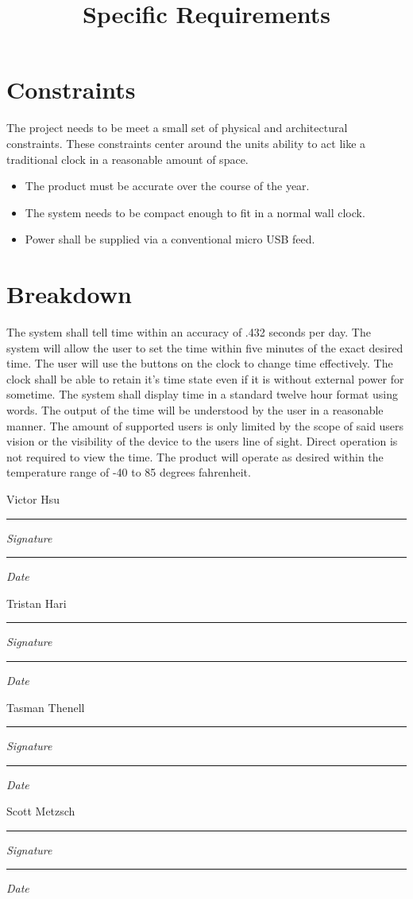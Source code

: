 \documentclass[10pt,draftclsnofoot,onecolumn]{IEEEtran}
\newcommand{\namesigdate}[2][7cm]{%
\begin{minipage}{#1}
    #2 \vspace{1.0cm}\hrule\smallskip
    \small \textit{Signature}
    \vspace{1.0cm}\hrule\smallskip
    \small \textit{Date}
\end{minipage}
}
\begin{document}
\section{Constraints}
The project needs to be meet a small set of physical and architectural constraints. These
constraints center around the units ability to act like a traditional clock in a reasonable
amount of space.
\begin{itemize}
	\item The product must be accurate over the course of the year.
	\item The system needs to be compact enough to fit in a normal wall clock.
	\item Power shall be supplied via a conventional micro USB feed.
\end{itemize}

\newpage
\title{Specific Requirements}
\section{Breakdown}
The system shall tell time within an accuracy of .432 seconds per day. The system will allow
the user to set the time within five minutes of the exact desired time. The user will use the
buttons on the clock to change time effectively. The clock shall be able to retain it’s time
state even if it is without external power for sometime. The system shall display time in a
standard twelve hour format using words. The output of the time will be understood by the user
in a reasonable manner. The amount of supported users is only limited by the scope of said
users vision or the visibility of the device to the users line of sight. Direct operation is
not required to view the time. The product will operate as desired within the temperature
range of -40 to 85 degrees fahrenheit.

\newpage

\noindent \namesigdate{Victor Hsu} \hfill \namesigdate{Tristan Hari} \par
\vspace{2cm}
\noindent \namesigdate{Tasman Thenell} \hfill \namesigdate{Scott Metzsch}
\end{document}
